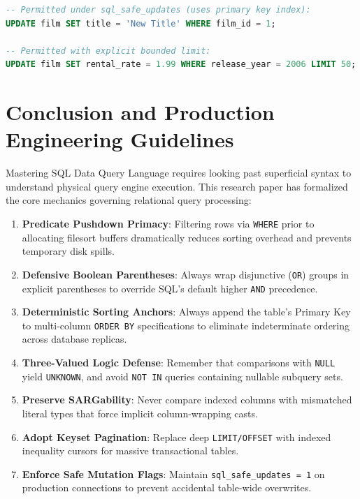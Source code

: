 \documentclass[10pt,journal,compsoc,onecolumn]{IEEEtran}
\begin{document}
\begin{lstlisting}[language=SQL]
-- Permitted under sql_safe_updates (uses primary key index):
UPDATE film SET title = 'New Title' WHERE film_id = 1;

-- Permitted with explicit bounded limit:
UPDATE film SET rental_rate = 1.99 WHERE release_year = 2006 LIMIT 50;
\end{lstlisting}

\section{Conclusion and Production Engineering Guidelines}
\label{sec:conclusion}

Mastering SQL Data Query Language requires looking past superficial syntax to understand physical query engine execution. This research paper has formalized the core mechanics governing relational query processing:
\begin{enumerate}
    \item \textbf{Predicate Pushdown Primacy}: Filtering rows via \texttt{WHERE} prior to allocating filesort buffers dramatically reduces sorting overhead and prevents temporary disk spills.
    \item \textbf{Defensive Boolean Parentheses}: Always wrap disjunctive (\texttt{OR}) groups in explicit parentheses to override SQL's default higher \texttt{AND} precedence.
    \item \textbf{Deterministic Sorting Anchors}: Always append the table's Primary Key to multi-column \texttt{ORDER BY} specifications to eliminate indeterminate ordering across database replicas.
    \item \textbf{Three-Valued Logic Defense}: Remember that comparisons with \texttt{NULL} yield \texttt{UNKNOWN}, and avoid \texttt{NOT IN} queries containing nullable subquery sets.
    \item \textbf{Preserve SARGability}: Never compare indexed columns with mismatched literal types that force implicit column-wrapping casts.
    \item \textbf{Adopt Keyset Pagination}: Replace deep \texttt{LIMIT/OFFSET} with indexed inequality cursors for massive transactional tables.
    \item \textbf{Enforce Safe Mutation Flags}: Maintain \texttt{sql\_safe\_updates = 1} on production connections to prevent accidental table-wide overwrites.
\end{enumerate}
\end{document}
